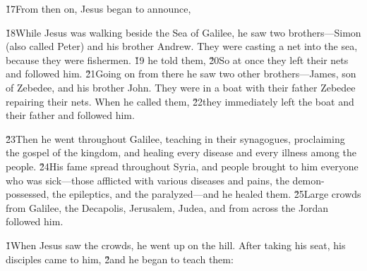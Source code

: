 \v{17}From then on, Jesus began to announce, 

\v{18}While Jesus was walking beside the Sea of Galilee, he saw two brothers---Simon (also called Peter) and his brother Andrew. They were casting a net into the sea, because they were fishermen. \v{19} he told them, \v{20}So at once they left their nets and followed him. \v{21}Going on from there he saw two other brothers---James, son of Zebedee, and his brother John. They were in a boat with their father Zebedee repairing their nets. When he called them, \v{22}they immediately left the boat and their father and followed him.

\v{23}Then he went throughout Galilee, teaching in their synagogues, proclaiming the gospel of the kingdom, and healing every disease and every illness among the people. \v{24}His fame spread throughout Syria, and people brought to him everyone who was sick---those afflicted with various diseases and pains, the demon-possessed, the epileptics, and the paralyzed---and he healed them. \v{25}Large crowds from Galilee, the Decapolis, Jerusalem, Judea, and from across the Jordan followed him.

\v{1}When Jesus saw the crowds, he went up on the hill. After taking his seat, his disciples came to him, \v{2}and he began to teach them:


